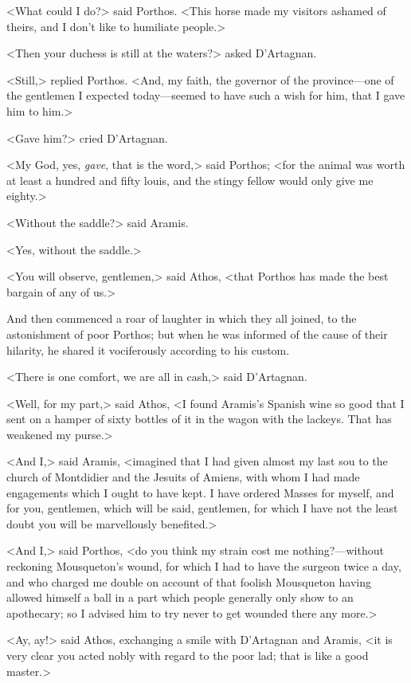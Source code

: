 <What could I do?> said Porthos. <This horse made my visitors ashamed of theirs, and I don't like to humiliate people.> 

<Then your duchess is still at the waters?> asked D'Artagnan. 

<Still,> replied Porthos. <And, my faith, the governor of the province—one of the gentlemen I expected today—seemed to have such a wish for him, that I gave him to him.> 

<Gave him?> cried D'Artagnan. 

<My God, yes, \emph{gave}, that is the word,> said Porthos; <for the animal was worth at least a hundred and fifty louis, and the stingy fellow would only give me eighty.> 

<Without the saddle?> said Aramis. 

<Yes, without the saddle.> 

<You will observe, gentlemen,> said Athos, <that Porthos has made the best bargain of any of us.> 

And then commenced a roar of laughter in which they all joined, to the astonishment of poor Porthos; but when he was informed of the cause of their hilarity, he shared it vociferously according to his custom. 

<There is one comfort, we are all in cash,> said D'Artagnan. 

<Well, for my part,> said Athos, <I found Aramis's Spanish wine so good that I sent on a hamper of sixty bottles of it in the wagon with the lackeys. That has weakened my purse.> 

<And I,> said Aramis, <imagined that I had given almost my last sou to the church of Montdidier and the Jesuits of Amiens, with whom I had made engagements which I ought to have kept. I have ordered Masses for myself, and for you, gentlemen, which will be said, gentlemen, for which I have not the least doubt you will be marvellously benefited.> 

<And I,> said Porthos, <do you think my strain cost me nothing?—without reckoning Mousqueton's wound, for which I had to have the surgeon twice a day, and who charged me double on account of that foolish Mousqueton having allowed himself a ball in a part which people generally only show to an apothecary; so I advised him to try never to get wounded there any more.> 

<Ay, ay!> said Athos, exchanging a smile with D'Artagnan and Aramis, <it is very clear you acted nobly with regard to the poor lad; that is like a good master.> 

